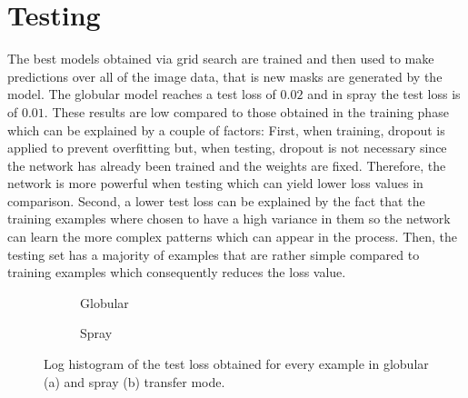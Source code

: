 \clearpage
\section{Testing}

The best models obtained via grid search are trained and then used to make predictions over all of the image data, that is new masks are generated by the model. The globular model reaches a test loss of $0.02$ and in spray the test loss is of $0.01$. These results are low compared to those obtained in the training phase which can be explained by a couple of factors: First, when training, dropout is applied to prevent overfitting but, when testing, dropout is not necessary since the network has already been trained and the weights are fixed. Therefore, the network is more powerful when testing which can yield lower loss values in comparison. Second, a lower test loss can be explained by the fact that the training examples where chosen to have a high variance in them so the network can learn the more complex patterns which can appear in the process. Then, the testing set has a majority of examples that are rather simple compared to training examples which consequently reduces the loss value. 
\begin{figure}
  \begin{subfigure}[b]{0.5\textwidth}
    
    \caption{Globular}
    \label{fig:globular_test_loss}
  \end{subfigure}
\hfill
  \begin{subfigure}[b]{0.5\textwidth}
    
    \caption{Spray}
    \label{fig:spray_test_loss}
  \end{subfigure}
  \caption[Log histogram of the test loss obtained for every example]{Log histogram of the test loss obtained for every example in globular (a) and spray (b) transfer mode.}
  \label{fig:test_loss_hist}
\end{figure}

